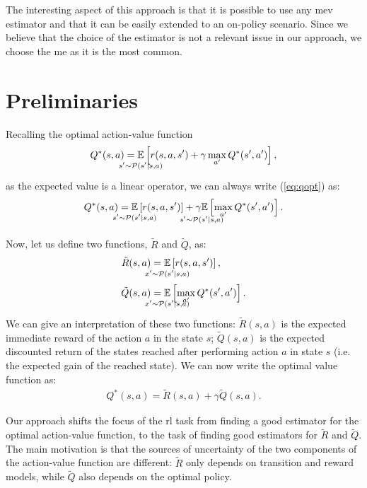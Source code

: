 The interesting aspect of this approach is that it is possible to use any \gls{mev} estimator and that it can be easily extended to an on-policy scenario. Since we believe that the choice of the estimator is not a relevant issue in our approach, we choose the \gls{me} as it is the most common.

\section{Preliminaries}
Recalling the optimal action-value function
\begin{align}
 Q^*(s,a)=\underset{\strut\mathclap{s'\sim \mathcal{P}(s'|s,a)}}{\mathbb{E}}\left[ r(s,a,s')+\gamma\max_{a'} Q^*(s',a')\right],
 \label{eq:qopt}
\end{align}
as the expected value is a linear operator, we can always write (\ref{eq:qopt}) as:
\begin{align}
 Q^*(s,a)=\underset{\strut\mathclap{s'\sim \mathcal{P}(s'|s,a)}}{\mathbb{E}}\left[ r(s,a,s')\right]+\underset{\strut\mathclap{s'\sim \mathcal{P}(s'|s,a)}}{\gamma\mathbb{E}}\left[ \max_{a'} Q^*(s',a')\right].
 \label{eq:qdec}
\end{align}

Now, let us define two functions, $\tilde{R}$ and $\tilde{Q}$, as:
\begin{align}
 \tilde{R}(s,a)&=\underset{\strut\mathclap{x'\sim \mathcal{P}(s'|s,a)}}{\mathbb{E}}\left[ r(s,a,s')\right], \nonumber\ \\
 \tilde{Q}(s,a)&=\underset{\strut\mathclap{x'\sim \mathcal{P}(s'|s,a)}}{\mathbb{E}}\left[\max_{a'} Q^*(s',a')\right].
 \label{eq:rqtilde}
\end{align}
We can give an interpretation of these two functions: $\tilde{R}(s,a)$ is the expected immediate reward of the action $a$ in the state $s$; $\tilde{Q}(s,a)$ is the expected discounted return of the states reached after performing action $a$ in state $s$ (i.e. the expected gain of the reached state).
We can now write the optimal value function as:
\begin{align}
 Q^*(s,a)=\tilde{R}(s,a)+\gamma\tilde{Q}(s,a).
 \label{eq:qdecrqtilde}
\end{align}

Our approach shifts the focus of the \gls{rl} task from finding a good estimator for the optimal action-value function, to the task of finding good estimators for $\tilde{R}$ and $\tilde{Q}$. The main motivation is that the sources of uncertainty of the two components of the action-value function are different: $\tilde{R}$ only depends on transition and reward models, while $\tilde{Q}$ also depends on the optimal policy.
